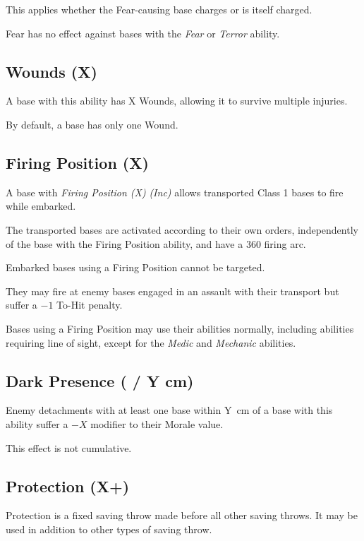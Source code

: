 This applies whether the Fear-causing base charges or is itself charged.

Fear has no effect against bases with the \textit{Fear} or \textit{Terror} ability.

\subsection{Wounds (X)}

A base with this ability has X Wounds, allowing it to survive multiple injuries.

By default, a base has only one Wound.

\subsection{Firing Position (X)}

A base with \textit{Firing Position (X)} \textit{(Inc)} allows transported Class 1 bases to fire while embarked.

The transported bases are activated according to their own orders, independently of the base with the Firing Position ability, and have a 360\textdegree{} firing arc.

Embarked bases using a Firing Position cannot be targeted.

They may fire at enemy bases engaged in an assault with their transport but suffer a $-1$ To-Hit penalty.

Bases using a Firing Position may use their abilities normally, including abilities requiring line of sight, except for the \textit{Medic} and \textit{Mechanic} abilities.

\subsection{Dark Presence ( / Y cm)}

Enemy detachments with at least one base within Y~cm of a base with this ability suffer a $-X$ modifier to their Morale value.

This effect is not cumulative.

\subsection{Protection (X+)}

Protection is a fixed saving throw made before all other saving throws. It may be used in addition to other types of saving throw.

